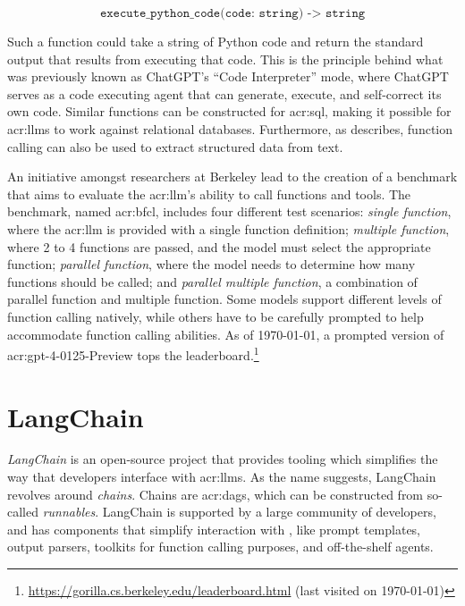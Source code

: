 $$
    \texttt{execute\_python\_code(code: string) -> string}
$$

Such a function could take a string of Python code and return the standard output that results from executing that code. This is the principle behind what was previously known as ChatGPT's \enquote{Code Interpreter} mode, where ChatGPT serves as a code executing agent that can generate, execute, and self-correct its own code. Similar functions can be constructed for \acrshort{acr:sql}, making it possible for \glspl{acr:llm} to work against relational databases. Furthermore, as \cite{eletiFunctionCallingOther2023} describes, function calling can also be used to extract structured data from text.

An initiative amongst researchers at Berkeley \citep{yanfanjiaBerkeleyFunctionCalling2024} lead to the creation of a benchmark that aims to evaluate the \acrshort{acr:llm}'s ability to call functions and tools. The benchmark, named \gls{acr:bfcl}, includes four different test scenarios: \textit{single function}, where the \acrshort{acr:llm} is provided with a single function definition; \textit{multiple function}, where 2 to 4 functions are passed, and the model must select the appropriate function; \textit{parallel function}, where the model needs to determine how many functions should be called; and \textit{parallel multiple function}, a combination of parallel function and multiple function. Some models support different levels of function calling natively, while others have to be carefully prompted to help accommodate function calling abilities. As of \today, a prompted version of \acrshort{acr:gpt}-4-0125-Preview tops the leaderboard.\footnote{\url{https://gorilla.cs.berkeley.edu/leaderboard.html} (last visited on \today)}

\section{LangChain}
\label{sec:langchain}

\textit{LangChain} \citep{langchainaiLangchainaiLangchain2022} is an open-source project that provides tooling which simplifies the way that developers interface with \glspl{acr:llm}. As the name suggests, LangChain revolves around \textit{chains}. Chains are \glspl{acr:dag}, which can be constructed from so-called \textit{runnables}. LangChain is supported by a large community of developers, and has components that simplify interaction with , like prompt templates, output parsers, toolkits for function calling purposes, and off-the-shelf agents.

